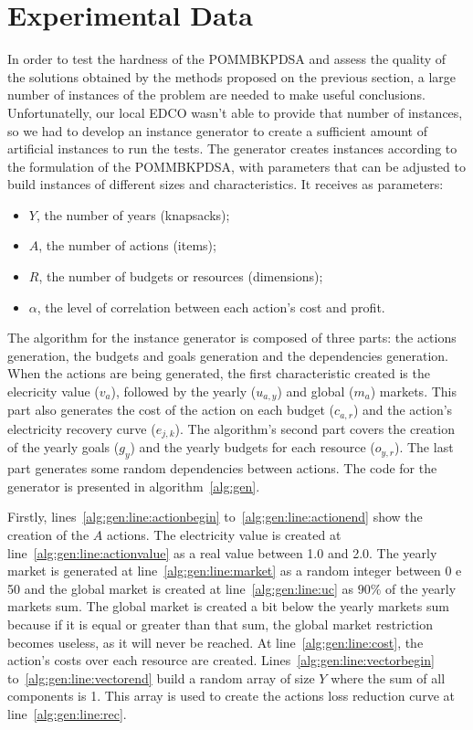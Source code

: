 \section{Experimental Data}
\label{sec:exp_data}

In order to test the hardness of the POMMBKPDSA and assess the quality of the solutions obtained by the methods 
proposed on the previous section, a large number of instances of the problem are needed to make useful 
conclusions. Unfortunatelly, our local EDCO wasn't able to provide that number of instances, so we had 
to develop an instance generator to create a sufficient amount of artificial instances to run the tests. 
The generator creates instances according to the formulation of the POMMBKPDSA, with parameters that can be 
adjusted to build instances of different sizes and characteristics. It receives as parameters:

\begin{itemize}
  \item $Y$, the number of years (knapsacks);
  \item $A$, the number of actions (items);
  \item $R$, the number of budgets or resources (dimensions);
  \item $\alpha$, the level of correlation between each action's cost and profit.
\end{itemize}

The algorithm for the instance generator is composed of three parts: the actions generation,
the budgets and goals generation and the dependencies generation. When the actions are 
being generated, the first characteristic created is the elecricity value ($v_a$), followed
by the yearly ($u_{a,y}$) and global ($m_a$) markets. This part also generates the cost of the
action on each budget ($c_{a,r}$) and the action's electricity recovery curve ($e_{j,k}$). The 
algorithm's second part covers the creation of the yearly goals ($g_y$) and the yearly budgets
for each resource ($o_{y,r}$). The last part generates some random dependencies between actions.
The code for the generator is presented in algorithm~\ref{alg:gen}.

Firstly, lines~\ref{alg:gen:line:actionbegin} to~\ref{alg:gen:line:actionend} show the creation of the $A$ actions.
The electricity value is created at line~\ref{alg:gen:line:actionvalue} as a real value between
1.0 and 2.0. The yearly market is generated at line~\ref{alg:gen:line:market} as a random integer between 0 e 50 
and the global market is created at line~\ref{alg:gen:line:uc} as $90\%$ of the yearly markets sum.
The global market is created a bit below the yearly markets sum because if it is equal or greater than that sum, the 
global market restriction becomes useless, as it will never be reached. At line~\ref{alg:gen:line:cost}, 
the action's costs over each resource are created. Lines~\ref{alg:gen:line:vectorbegin} to~\ref{alg:gen:line:vectorend} build a 
random array of size $Y$ where the sum of all components is 1. This array is used to create the actions loss reduction curve at 
line~\ref{alg:gen:line:rec}.

